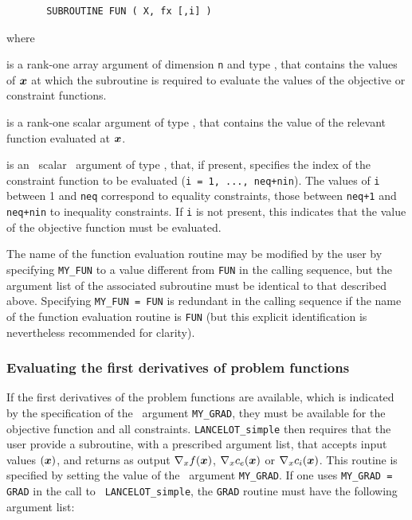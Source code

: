 \documentclass{galahad}
\begin{document}
\def\baselinestretch{0.8}
{\tt \begin{verbatim}
       SUBROUTINE FUN ( X, fx [,i] )
\end{verbatim} }\def\baselinestretch{1.0}
\noindent
where
\begin{description}
 is a rank-one \intentin array argument of
dimension {\tt n} and type \realdp,
that contains the values of ${\bm{x}}$ at which the
subroutine is required to evaluate the values
of the objective or constraint functions.

 is a rank-one \intentout scalar argument of
  type \realdp, that contains the value of the relevant
  function evaluated at ${\bm{x}}$.

 is an \optional\ scalar \intentin\ argument of type \integer,
that, if present, specifies the index of the constraint function to be
evaluated  ({\tt i = 1, ..., neq+nin}).  The values of {\tt i}
between 1 and {\tt neq} correspond to equality constraints, those between
{\tt neq+1} and {\tt neq+nin} to inequality constraints. If {\tt i} is not
present, this indicates that the value of the objective function must be
evaluated.
\end{description}

\noindent
The name of the function evaluation routine may be modified by the user
by specifying {\tt MY\_FUN} to a value different from {\tt FUN} in the calling
sequence, but the argument list of the associated subroutine must be identical
to that described above. Specifying  {\tt MY\_FUN = FUN} is redundant in the
calling sequence if the name of the function evaluation routine is {\tt FUN}
(but this explicit identification is nevertheless recommended for clarity).

\subsubsection{Evaluating the first derivatives of problem functions\label{pfg}}

If the first derivatives of the problem functions are available, which is
indicated by the specification of the \optional\ argument {\tt MY\_GRAD}, they
must be available for the objective function and all constraints.
{\tt LANCELOT\_simple} then requires that the user provide a subroutine, with
a  prescribed argument list, that accepts input values $({\bm{x}})$, and returns as
output  $\nabla_x f({\bm{x}})$,  $\nabla_x c_e({\bm{x}})$ or $\nabla_x c_i({\bm{x}})$.
This routine is specified by setting the value of the \optional\ argument
{\tt MY\_GRAD}. If one uses {\tt MY\_GRAD = GRAD} in the call to {\tt
  LANCELOT\_simple}, the {\tt GRAD} routine must have the following argument
list:
\end{document}
